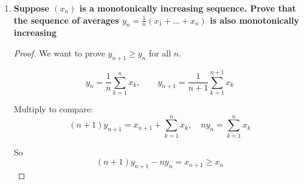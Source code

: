 \documentclass[14pt]{extarticle}
\begin{document}
\begin{enumerate}
\begin{proof}
We can write
\[
x_n=\sum_{k=n+1}^{2n}\frac{1}{k}=H_{2n}-H_n
\]
where $H_m=1+\tfrac12+\cdots+\tfrac1m$ is the $m$-th harmonic number.

\medskip
\textbf{Monotonicity:} 
Compute $x_{n+1}-x_n$:
\begin{align*}
x_{n+1}-x_n&=\Bigl(H_{2n+2}-H_{n+1}\Bigr)-\Bigl(H_{2n}-H_n\Bigr)\\
&=\frac{1}{2n+1}+\frac{1}{2n+2}-\frac{1}{n+1}
\end{align*}

Simplify:

\begin{align*}
&=\frac{1}{2n+1}+\frac{1}{2n+2}-\frac{1}{n+1} \\
&=\frac{1}{2n+1} - \frac{1}{2n+2} \\
&= \frac{1}{(2n+1)(2n+2)}
\end{align*}

After simplification, the difference becomes positive, hence $x_{n+1}>x_n$. Therefore $(x_n)$ is monotonically increasing.

\medskip
\textbf{Boundedness above:} 
For each $k\in\{n+1,\dots,2n\}$ we have $\tfrac1k<\tfrac1n$. Since there are $n$ terms,
\[
x_n<\frac{n}{n}=1
\]
so the sequence is bounded above by $1$.

\medskip
\textbf{Limit bounds:} 
Note that for $k=n+1,\dots,2n$ we also have $k\le2n$, hence $\tfrac1k\ge\tfrac1{2n}$. Thus
\[
x_n\ge n\cdot \frac{1}{2n}=\frac{1}{2}
\]
So $\tfrac12\le x_n<1$ for all $n$. Therefore the limit $L=\lim_{n\to\infty}x_n$ exists and lies between $\tfrac12$ and $1$.

\[
\boxed{\tfrac12\le\lim_{n\to\infty}x_n\le1}
\]
\end{proof}

\newpage
\item \textbf{Suppose $(x_n)$ is a monotonically increasing sequence. Prove that the sequence of averages $y_n=\tfrac1n(x_1+\dots+x_n)$ is also monotonically increasing}

\begin{proof}
We want to prove $y_{n+1}\ge y_n$ for all $n$.

\[
y_n=\frac{1}{n}\sum_{k=1}^n x_k, 
\qquad y_{n+1}=\frac{1}{n+1}\sum_{k=1}^{n+1} x_k
\]

Multiply to compare:
\[
(n+1)y_{n+1}=x_{n+1}+\sum_{k=1}^n x_k, 
\quad n y_n=\sum_{k=1}^n x_k
\]

So
\[
(n+1)y_{n+1}-n y_n=x_{n+1}\ge x_n
\]


\end{proof}
\end{enumerate}
\end{document}
